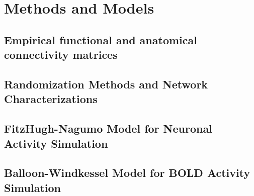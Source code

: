 
\chapter{Methods and Models} %

\label{Chapter2} %



\section{Empirical functional and anatomical connectivity matrices}

\section{Randomization Methods and Network Characterizations}

\section{FitzHugh-Nagumo Model for Neuronal Activity Simulation}

\section{Balloon-Windkessel Model for BOLD Activity Simulation} 
 

